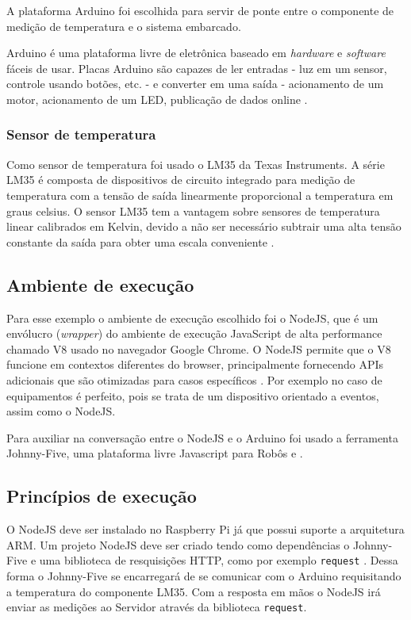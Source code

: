 A plataforma Arduino foi escolhida para servir de ponte entre o
componente de medição de temperatura e o sistema embarcado.

Arduino é uma plataforma livre de eletrônica baseado em \emph{hardware}
e \emph{software} fáceis de usar. Placas Arduino são capazes de ler
entradas - luz em um sensor, controle usando botões, etc. - e converter
em uma saída - acionamento de um motor, acionamento de um LED,
publicação de dados online \cite{arduino:2016}.

\subsubsection{Sensor de temperatura}\label{sensor-de-temperatura}

Como sensor de temperatura foi usado o LM35 da Texas Instruments. A
série LM35 é composta de dispositivos de circuito integrado para medição
de temperatura com a tensão de saída linearmente proporcional a
temperatura em graus celsius. O sensor LM35 tem a vantagem sobre
sensores de temperatura linear calibrados em Kelvin, devido a não ser
necessário subtrair uma alta tensão constante da saída para obter uma
escala conveniente \cite{lm35:2016}.

\subsection{Ambiente de execução}\label{ambiente-de-execuuxe7uxe3o}

Para esse exemplo o ambiente de execução escolhido foi o NodeJS, que é
um envólucro (\emph{wrapper}) do ambiente de execução JavaScript de alta
performance chamado V8 usado no navegador Google Chrome. O NodeJS
permite que o V8 funcione em contextos diferentes do browser,
principalmente fornecendo APIs adicionais que são otimizadas para casos
específicos \cite{hughes-croucher:2012}. Por exemplo no caso de
equipamentos \iot é perfeito, pois se trata de um dispositivo orientado
a eventos, assim como o NodeJS.

Para auxiliar na conversação entre o NodeJS e o Arduino foi usado a
ferramenta Johnny-Five, uma plataforma livre Javascript para Robôs e
\iot \cite{johnny-five:2012}.

\subsection{Princípios de
execução}\label{princuxedpios-de-execuuxe7uxe3o}

O NodeJS deve ser instalado no Raspberry Pi já que possui suporte a
arquitetura ARM. Um projeto NodeJS deve ser criado tendo como
dependências o Johnny-Five e uma biblioteca de resquisições HTTP, como
por exemplo \texttt{request} \cite{request:2016}. Dessa forma o
Johnny-Five se encarregará de se comunicar com o Arduino requisitando a
temperatura do componente LM35. Com a resposta em mãos o NodeJS irá
enviar as medições ao Servidor através da biblioteca \texttt{request}.


